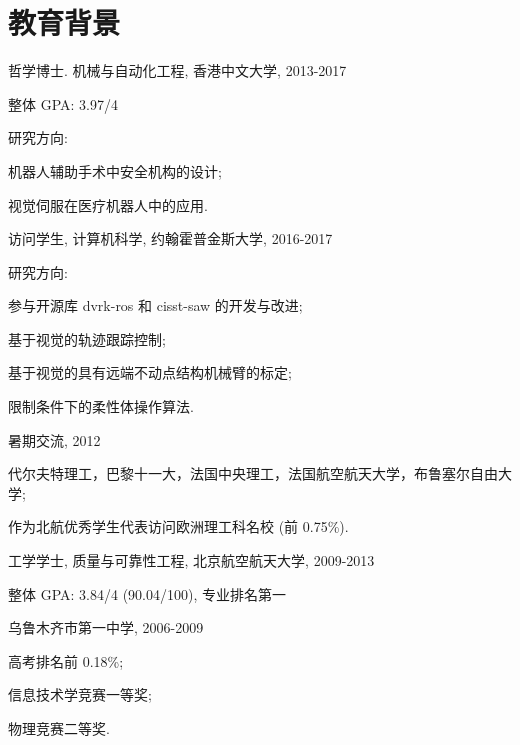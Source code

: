 \documentclass[10pt,letterpaper]{article}
\renewcommand\emph[1]{%
  {#1}
}
\renewenvironment{itemize}{
\begin{list}{}{
    \setlength{\leftmargin}{1.5em}
    \setlength{\itemsep}{0.25em}
    \setlength{\parskip}{0pt}
    \setlength{\parsep}{0.25em}
    }
    }{
\end{list}
}
\begin{document}
\section*{教育背景}

\begin{itemize}
    \item 哲学博士. 机械与自动化工程, 香港中文大学, 2013-2017
    \begin{itemize}
        \item \emph{整体 GPA:} 3.97/4
        \item \emph{研究方向:}
        \begin{itemize}
            \item 机器人辅助手术中安全机构的设计;
            \item 视觉伺服在医疗机器人中的应用.
        \end{itemize}
    \end{itemize}
    \item 访问学生, 计算机科学, 约翰霍普金斯大学, 2016-2017
    \begin{itemize}
        \item \emph{研究方向:}
        \begin{itemize}
            \item 参与开源库 dvrk-ros 和 cisst-saw 的开发与改进;
            \item 基于视觉的轨迹跟踪控制;
            \item 基于视觉的具有远端不动点结构机械臂的标定;
            \item 限制条件下的柔性体操作算法.
        \end{itemize}
    \end{itemize}
    \item 暑期交流, 2012
    \begin{itemize}
        \item 代尔夫特理工，巴黎十一大，法国中央理工，法国航空航天大学，布鲁塞尔自由大学;
        \item 作为北航优秀学生代表访问欧洲理工科名校 (前 0.75\%).
    \end{itemize}
    \item 工学学士, 质量与可靠性工程, 北京航空航天大学, 2009-2013
    \begin{itemize}
        \item \emph{整体 GPA:} 3.84/4 (90.04/100), 专业排名第一
    \end{itemize}
    \item 乌鲁木齐市第一中学, 2006-2009
    \begin{itemize}
        \item 高考排名前 0.18\%;
        \item 信息技术学竞赛一等奖;
        \item 物理竞赛二等奖.
    \end{itemize}
\end{itemize}
\end{document}
